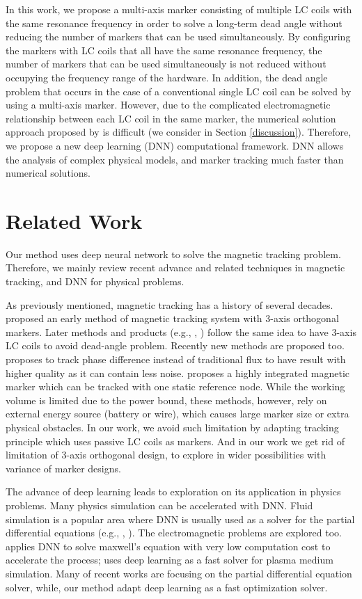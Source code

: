 \documentclass[journal,twoside,web]{ieeecolor}
\begin{document}
In this work, we propose a multi-axis marker consisting of multiple LC coils with the same resonance frequency in order to solve a long-term dead angle without reducing the number of markers that can be used simultaneously. By configuring the markers with LC coils that all have the same resonance frequency, the number of markers that can be used simultaneously is not reduced without occupying the frequency range of the hardware. In addition, the dead angle problem that occurs in the case of a conventional single LC coil can be solved by using a multi-axis marker. However, due to the complicated electromagnetic relationship between each LC coil in the same marker, the numerical solution approach proposed by \cite{im6d} is difficult (we consider in Section \ref{discussion}). Therefore, we propose a new deep learning (DNN) computational framework. DNN allows the analysis of complex physical models, and marker tracking much faster than numerical solutions.

\section{Related Work}
Our method uses deep neural network to solve the magnetic tracking problem. Therefore, we mainly review recent advance and related techniques in magnetic tracking, and DNN for physical problems.

As previously mentioned, magnetic tracking has a history of several decades. \cite{Raab} proposed an early method of magnetic tracking system with 3-axis orthogonal markers. Later methods and products (e.g., \cite{Outside in}, \cite{Closed-form}) follow the same idea to have 3-axis LC coils to avoid dead-angle problem. Recently new methods are proposed too. \cite{Phase difference} proposes to track phase difference instead of traditional flux to have result with higher quality as it can contain less noise. \cite{Make it trackable} proposes a highly integrated magnetic marker which can be tracked with one static reference node. While the working volume is limited due to the power bound, these methods, however, rely on external energy source (battery or wire), which causes large marker size or extra physical obstacles. In our work, we avoid such limitation by adapting \cite{im6d} tracking principle which uses passive LC coils as markers. And in our work we get rid of limitation of 3-axis orthogonal design, to explore in wider possibilities with variance of marker designs.

The advance of deep learning leads to exploration on its application in physics problems. Many physics simulation can be accelerated with DNN. Fluid simulation is a popular area where DNN is usually used as a solver for the partial differential equations (e.g., \cite{TurbulantSimulation}, \cite{Fluid flow}). The electromagnetic problems are explored too. \cite{Maxwell} applies DNN to solve maxwell's equation with very low computation cost to accelerate the process; \cite{Plasma} uses deep learning as a fast solver for plasma medium simulation. Many of recent works are focusing on the partial differential equation solver, while, our method adapt deep learning as a fast optimization solver.
\end{document}
